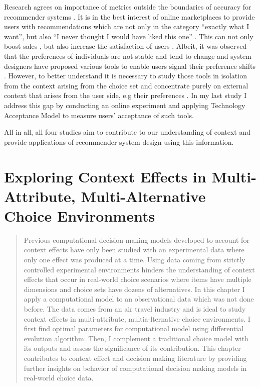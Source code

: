 \documentclass[a4paper,12pt]{article}
\begin{document}
Research agrees on importance of metrics outside the boundaries of accuracy for recommender systems \citep{kaminskas2016diversity}. It is in the best interest of online marketplaces to provide users with recommendations which are not only in the category ``exactly what I want'', but also ``I never thought I would have liked this one'' \citep{kotkovSurveySerendipityRecommender2016}. This can not only boost sales \citep{songWhenHowDiversify2019}, but also increase the satisfaction of users \citep{knijnenburgExplainingUserExperience2012}. Albeit, it was observed that the preferences of individuals are not stable and tend to change and system designers have proposed various tools to enable users signal their preference shifts \citep{bostandjiev2012tasteweights,hijikata2012relation}. However, to better understand it is necessary to study those tools in isolation from the context arising from the choice set and concentrate purely on external context that arises from the user side, e.g their preferences \citep{adomavicius2011context}. In my last study I address this gap by conducting an online experiment and applying Technology Acceptance Model \citep{davis1985technology} to measure users' acceptance of such tools.

All in all, all four studies aim to contribute to our understanding of context and provide applications of recommender system design using this information.

\newpage

\section{Exploring Context Effects in Multi-Attribute, Multi-Alternative Choice Environments}\label{chapter:simulationStudy}
\begin{abstract}
    
    Previous computational decision making models developed to account for context effects have only been
    studied with an experimental data where only one effect was produced at a time. Using data coming from strictly controlled experimental environments
    hinders the understanding of context effects that occur in real-world choice scenarios where items have multiple dimensions and choice sets have dozens of alternatives. In this chapter
    I apply a computational model to an observational data which was not done before. The data comes from an air travel industry and is ideal to study context effects in multi-attribute, multia-lternative choice environments. I first find optimal parameters for computational model using differential evolution algorithm. Then, I complement a traditional choice model with its outputs and assess the significance of its contribution. This chapter contributes to context effect and decision making literature by providing further insights on behavior of computational decision making models in real-world choice data.
    
\end{abstract}
\end{document}
